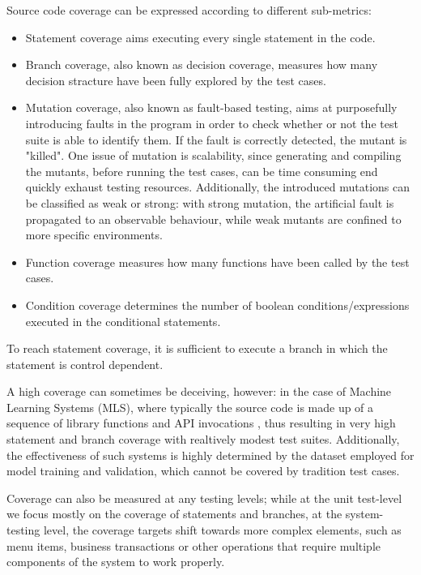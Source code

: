 Source code coverage can be expressed according to different sub-metrics:
\begin {itemize}
    \item Statement coverage aims executing every single statement in the code.
    \item Branch coverage, also known as decision coverage, measures how many decision stracture have been fully explored by the test cases.
    \item Mutation coverage, also known as fault-based testing, aims at purposefully introducing faults in the program in order to 
            check whether or not the test suite is able to identify them. If the fault is correctly detected, the mutant is "killed".
            One issue of mutation is scalability, since generating and compiling the mutants, before running the test cases, can be time
            consuming end quickly exhaust testing resources. Additionally, the introduced mutations can be classified as weak or strong:
            with strong mutation, the artificial fault is propagated to an observable behaviour, while weak mutants are confined to more 
            specific environments.
    \item Function coverage measures how many functions have been called by the test cases.
    \item Condition coverage determines the number of boolean conditions/expressions executed in the conditional statements.
\end {itemize}
To reach statement coverage, it is sufficient to execute a branch in which the statement is control dependent.

A high coverage can sometimes be deceiving, however: in the case of Machine Learning Systems (MLS), where typically the source code is made up 
of a sequence of library functions and API invocations \cite{article2}, thus resulting in very high statement and branch coverage with realtively modest
test suites.
Additionally, the effectiveness of such systems is highly determined by the dataset employed for model training and validation, which
cannot be covered by tradition test cases.

Coverage can also be measured at any testing levels; while at the unit test-level we focus mostly on the coverage of statements and branches,
at the system-testing level, the coverage targets shift towards more complex elements, such as menu items, business transactions or other
operations that require multiple components of the system to work properly.

